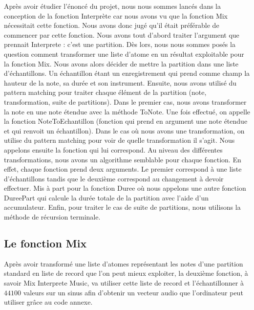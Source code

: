 \documentclass[a4paper,12pt]{article}
\begin{document}
Après avoir étudier l'énoncé du projet, nous nous sommes lancés dans la conception de la fonction Interprète car nous avons vu
que la fonction Mix nécessitait cette fonction. Nous avons donc jugé qu'il était préférable de commencer par cette fonction.
Nous avons tout d'abord traiter l'argument que prennait Interprete : c'est une partition. Dès lors, nous nous sommes posés la 
question comment transformer une liste d'atome en un résultat exploitable pour la fonction Mix. Nous avons alors décider 
de mettre la partition dans une liste d'échantillons. Un échantillon étant un enregistrement qui prend comme champ la hauteur
de la note, sa durée et son instrument. Ensuite, nous avons utilisé du pattern matching pour traiter chaque élément de la 
partition (note, transformation, suite de partitions). 
Dans le premier cas, nous avons transformer la note en une note étendue avec la méthode ToNote. Une fois effectué, on appelle 
la fonction NoteToEchantillon (fonction qui prend en argument une note étendue et qui renvoit un échantillon).
Dans le cas où nous avons une transformation, on utilise du pattern matching pour voir de quelle transformation il s'agit. 
Nous appelons ensuite la fonction qui lui correspond. Au niveau des différentes transformations, nous avons un algorithme 
semblable pour chaque fonction. En effet, chaque fonction prend deux arguments. Le premier correspond à une liste 
d'échantillons tandis que le deuxième correspond au changement à devoir effectuer. Mis à part pour la fonction Duree où nous 
appelons une autre fonction DureePart qui calcule la durée totale de la partition avec l'aide d'un accumulateur.
Enfin, pour traiter le cas de suite de partitions, nous utilisons la méthode de récursion terminale.

\subsection{Le fonction Mix}

Après avoir transformé une liste d'atomes représentant les notes d'une partition standard en liste de record que l'on peut
mieux exploiter, la deuxième fonction, à savoir {Mix Interprete Music}, va utiliser cette liste de record et l'échantillonner
à $44100$ valeurs sur un sinus afin d'obtenir un vecteur audio que l'ordinateur peut utiliser grâce au code annexe.
\end{document}
